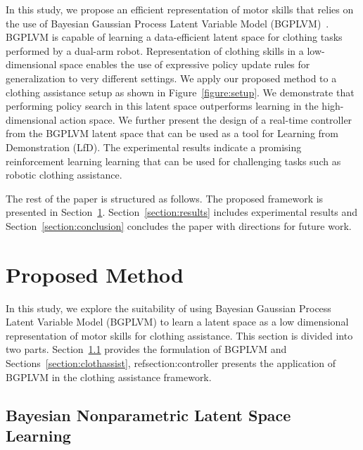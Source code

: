 \documentclass{article}
\begin{document}
In this study, we propose an efficient representation of motor skills that relies on the use of Bayesian Gaussian Process Latent Variable Model (BGPLVM)~\cite{bgplvm}. BGPLVM is capable of learning a data-efficient latent space for clothing tasks performed by a dual-arm robot. Representation of clothing skills in a low-dimensional space enables the use of expressive policy update rules for generalization to very different settings. We apply our proposed method to a clothing assistance setup as shown in Figure~\ref{figure:setup}. We demonstrate that performing policy search in this latent space outperforms learning in the high-dimensional action space. We further present the design of a real-time controller from the BGPLVM latent space that can be used as a tool for Learning from Demonstration (LfD). The experimental results indicate a promising reinforcement learning learning that can be used for challenging tasks such as robotic clothing assistance.

The rest of the paper is structured as follows. The proposed framework is presented in Section~\ref{section:method}. Section~\ref{section:results} includes experimental results and Section~\ref{section:conclusion} concludes the paper with directions for future work.

\section{Proposed Method}
\label{section:method}

In this study, we explore the suitability of using Bayesian Gaussian Process Latent Variable Model (BGPLVM) to learn a latent space as a low dimensional representation of motor skills for clothing assistance. This section is divided into two parts. Section~\ref{section:bgplvm} provides the formulation of BGPLVM and Sections~\ref{section:clothassist}, ref{section:controller} presents the application of BGPLVM in the clothing assistance framework.

\subsection{Bayesian Nonparametric Latent Space Learning}
\label{section:bgplvm}
\end{document}
